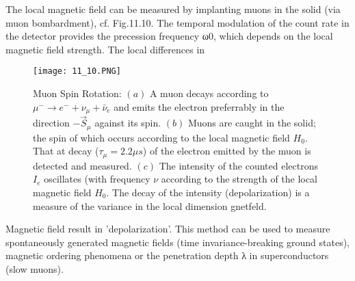 The local magnetic field can be measured by implanting muons in the solid (via muon bombardment), cf. Fig.11.10. The temporal modulation of the count rate in the detector provides the precession frequency ω0, which depends on the local magnetic field strength. The local differences in
\begin{figure}[ht]
    \centering
    \texttt{[image: 11\_10.PNG]}
    \caption{Muon Spin Rotation: $(a)$ A muon decays according to $\mu^-\rightarrow e^-+\nu_{\mu}+\bar{\nu}_e$ and emits the electron preferrably in the direction $-\vec{S}_{\mu}$ against its spin. $(b)$ Muons are caught in the solid; the spin of which occurs according to the local magnetic field $H_0$. That at decay ($\tau_{\mu}=2.2\mu s$) of the electron emitted by the muon is detected and measured. $(c)$ The intensity of the counted electrons $I_e$ oscillates (with frequency $\nu$ according to the strength of the local magnetic field $H_0$. The decay of the intensity (depolarization) is a measure of the variance in the local dimension gnetfeld.}
\end{figure}
Magnetic field result in 'depolarization'. This method can be used to measure spontaneously generated magnetic fields (time invariance-breaking ground states), magnetic ordering phenomena or the penetration depth λ in superconductors (slow muons).

